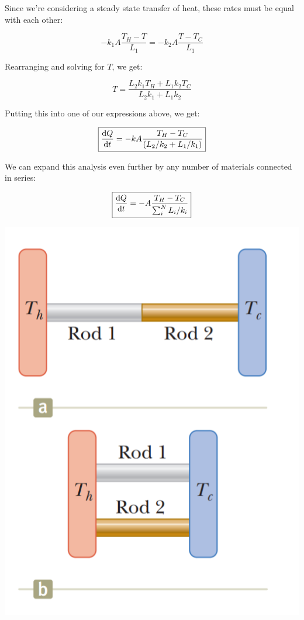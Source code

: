 \documentclass{report}
\begin{document}
Since we're considering a steady state transfer of heat, these rates must be equal with each other:

$$-k_1A\frac{T_H-T}{L_1} = -k_2A\frac{T-T_C}{L_1}$$

Rearranging and solving for $T$, we get:

$$T = \frac{L_2k_1T_H+L_1k_2T_C}{L_2k_1+L_1k_2}$$

Putting this into one of our expressions above, we get:

$$\boxed{\dv{Q}{t} = -kA\frac{T_H-T_C}{(L_2/k_2+L_1/k_1)} }$$

We can expand this analysis even further by any number of materials connected in series:

$$\boxed{\dv{Q}{t} = -A\frac{T_H-T_C}{\sum_i^NL_i/k_i} }$$

\begin{center}
    \includegraphics[scale=0.5]{con_series_par.PNG}
\end{center}
\end{document}
